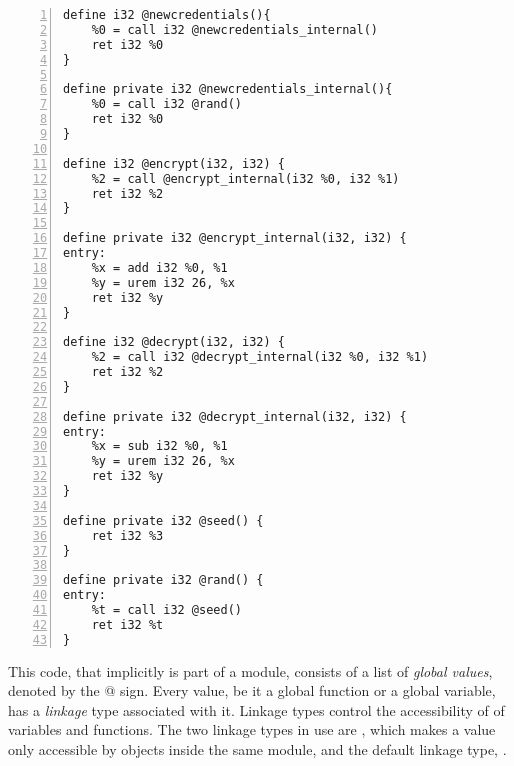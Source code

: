 \begin{lstlisting}[frame=single,numbers=left, language={[x86masm]Assembler}, caption=LLVM IR for the example,
label=llvm:Example]
define i32 @newcredentials(){
	%0 = call i32 @newcredentials_internal()
	ret i32 %0
}

define private i32 @newcredentials_internal(){
	%0 = call i32 @rand()
	ret i32 %0
}

define i32 @encrypt(i32, i32) {
	%2 = call @encrypt_internal(i32 %0, i32 %1)
	ret i32 %2
}

define private i32 @encrypt_internal(i32, i32) { 
entry:
	%x = add i32 %0, %1
	%y = urem i32 26, %x 
	ret i32 %y
}

define i32 @decrypt(i32, i32) { 
	%2 = call i32 @decrypt_internal(i32 %0, i32 %1)
	ret i32 %2
}

define private i32 @decrypt_internal(i32, i32) { 
entry:
	%x = sub i32 %0, %1
	%y = urem i32 26, %x 
	ret i32 %y
}

define private i32 @seed() {
    ret i32 %3
}

define private i32 @rand() {
entry:
	%t = call i32 @seed()
	ret i32 %t
}
\end{lstlisting}

This code, that implicitly is part of a module, consists of a list of \emph{global values}, denoted by the @ sign.
Every value, be it a global function or a global variable, has a \emph{linkage} type associated with it.
Linkage types control the accessibility of of variables and functions. The two linkage types in use are , which makes a value only accessible by objects inside the same module, and the default linkage type, .

